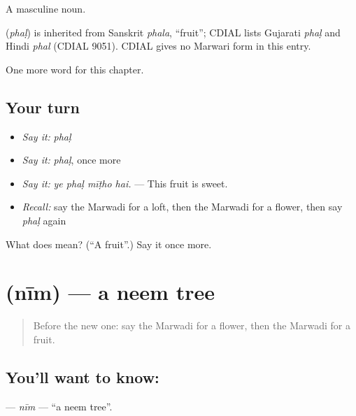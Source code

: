 A masculine noun.

\begin{cousinweb}
\textbf{} (\emph{phaḷ}) is inherited from Sanskrit \emph{phala}, \textquotedblleft{}fruit\textquotedblright{}; CDIAL lists Gujarati \emph{phaḷ} and Hindi \emph{phal} (CDIAL 9051). CDIAL gives no Marwari form in this entry.
\end{cousinweb}

\begin{grammarlens}[title={What you've built}]
One more word for this chapter.
\end{grammarlens}

\subsection*{Your turn}
\begin{itemize}
\raggedright
  \item \emph{Say it:} \emph{phaḷ}
  \item \emph{Say it:} \emph{phaḷ}, once more
  \item \emph{Say it:} \emph{ye phaḷ mīṭho hai.} — This fruit is sweet.
  \item \emph{Recall:} say the Marwadi for a loft, then the Marwadi for a flower, then say \emph{phaḷ} again
\end{itemize}

\begin{tcolorbox}[breakable,colback=teal!4,colframe=teal!35!black,title={Before you move on}]
What does  mean? (\textquotedblleft{}A fruit\textquotedblright{}.) Say it once more.
\end{tcolorbox}
\section[\texorpdfstring{\mw{नीम} (nīm)}{नीम (nīm)}]{ (nīm) — a neem tree}

\label{lesson:MW-C188-nim}



\begin{quote}
Before the new one: say the Marwadi for a flower, then the Marwadi for a fruit.
\end{quote}

\subsection*{You'll want to know: }
\textbf{} — \emph{nīm} — \textquotedblleft{}a neem tree\textquotedblright{}.


